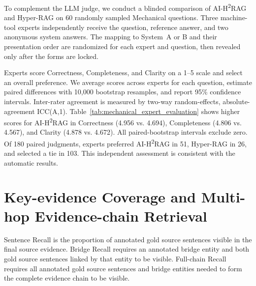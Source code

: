 \documentclass{article} %
\begin{document}
To complement the LLM judge, we conduct a blinded comparison of AI-H\textsuperscript{2}RAG and Hyper-RAG on 60 randomly sampled Mechanical questions. Three machine-tool experts independently receive the question, reference answer, and two anonymous system answers. The mapping to System~A or B and their presentation order are randomized for each expert and question, then revealed only after the forms are locked.

Experts score Correctness, Completeness, and Clarity on a 1--5 scale and select an overall preference. We average scores across experts for each question, estimate paired differences with 10,000 bootstrap resamples, and report 95\% confidence intervals. Inter-rater agreement is measured by two-way random-effects, absolute-agreement ICC(A,1). Table~\ref{tab:mechanical_expert_evaluation} shows higher scores for AI-H\textsuperscript{2}RAG in Correctness (4.956 vs. 4.694), Completeness (4.806 vs. 4.567), and Clarity (4.878 vs. 4.672). All paired-bootstrap intervals exclude zero. Of 180 paired judgments, experts preferred AI-H\textsuperscript{2}RAG in 51, Hyper-RAG in 26, and selected a tie in 103. This independent assessment is consistent with the automatic results.


\section{Key-evidence Coverage and Multi-hop Evidence-chain Retrieval}
\label{app:key_evidence_chain_retrieval}

\begin{table}[H]
\centering
\caption{Evidence coverage on the frozen Mechanical evaluation set. Values in the three recall columns are percentages, reported as AI-H\textsuperscript{2}RAG / Hyper-RAG. $\Delta$ is AI-H\textsuperscript{2}RAG minus Hyper-RAG in percentage points, with 95\% paired-bootstrap confidence intervals.}
\label{tab:rq6_evidence_chain_retrieval}
\setlength{\tabcolsep}{2pt}
\footnotesize
\renewcommand{\arraystretch}{1.12}
\renewcommand{\arraystretch}{1}

\raggedright\footnotesize Sentence Recall is the proportion of annotated gold source sentences visible in the final source evidence. Bridge Recall requires an annotated bridge entity and both gold source sentences linked by that entity to be visible. Full-chain Recall requires all annotated gold source sentences and bridge entities needed to form the complete evidence chain to be visible.
\end{table}
\end{document}
